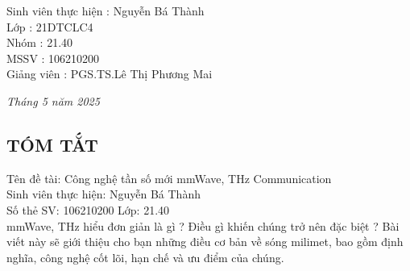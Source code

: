 \documentclass[a4paper,13pt]{article}
\begin{document}
\begin{titlepage}
\begin{flushleft}
\hspace{4cm}Sinh viên thực hiện \hspace{0.05cm}: Nguyễn Bá Thành \\
\hspace{4cm}Lớp \hspace{3.2cm}: 21DTCLC4 \\
\hspace{4cm}Nhóm \hspace{2.7cm}: 21.40 \\
\hspace{4cm}MSSV \hspace{2.7cm}: 106210200 \\
\hspace{4cm}Giảng viên \hspace{1.8cm}: PGS.TS.Lê Thị Phương Mai \\
\end{flushleft}
\vspace{3cm}
\begin{center}
    \textit{Tháng 5 năm 2025}
\end{center}
\end{titlepage}

\begin{center}
\section{TÓM TẮT}
\end{center}
Tên đề tài: Công nghệ tần số mới mmWave, THz Communication \\
Sinh viên thực hiện: Nguyễn Bá Thành\\
Số thẻ SV: 106210200 Lớp: 21.40 \\

mmWave, THz hiểu đơn giản là gì ? Điều gì khiến chúng trở nên đặc biệt ? Bài viết này sẽ giới thiệu cho bạn những điều cơ bản về sóng milimet, bao gồm định nghĩa, công nghệ cốt lõi, hạn chế và ưu điểm của chúng.
\end{document}
